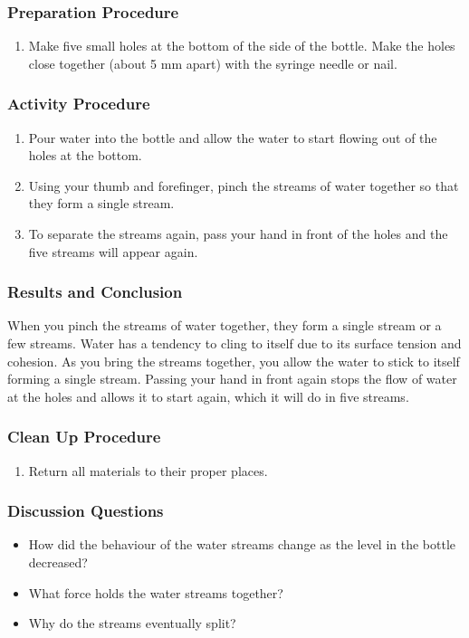 \subsubsection*{Preparation Procedure}
\begin{enumerate}
\item{Make five small holes at the bottom of the side of the bottle. Make the holes close together (about 5 mm apart) with the syringe needle or nail.}
\end{enumerate}

\subsubsection*{Activity Procedure}
\begin{enumerate}
\item{Pour water into the bottle and allow the water to start flowing out of the holes at the bottom.}
\item{Using your thumb and forefinger, pinch the streams of water together so that they form a single stream.}
\item{To separate the streams again, pass your hand in front of the holes and the five streams will appear again.}
\end{enumerate}

\subsubsection*{Results and Conclusion}
When you pinch the streams of water together, they form a single stream or a few streams. Water has a tendency to cling to itself due to its surface tension and cohesion. As you bring the streams together, you allow the water to stick to itself forming a single stream. Passing your hand in front again stops the flow of water at the holes and allows it to start again, which it will do in five streams.

\subsubsection*{Clean Up Procedure}
\begin{enumerate}
\item{Return all materials to their proper places.}
\end{enumerate}

\subsubsection*{Discussion Questions}
\begin{itemize}
\item{How did the behaviour of the water streams change as the level in the bottle decreased?}
\item{What force holds the water streams together?}
\item{Why do the streams eventually split?}
\end{itemize}

